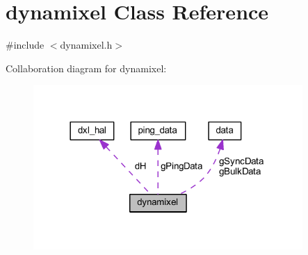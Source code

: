 \hypertarget{classdynamixel}{}\section{dynamixel Class Reference}
\label{classdynamixel}


{\ttfamily \#include $<$dynamixel.\+h$>$}



Collaboration diagram for dynamixel\+:\nopagebreak
\begin{figure}[H]
\begin{center}
\leavevmode
\includegraphics[width=290pt]{df/d4c/classdynamixel__coll__graph}
\end{center}
\end{figure}
